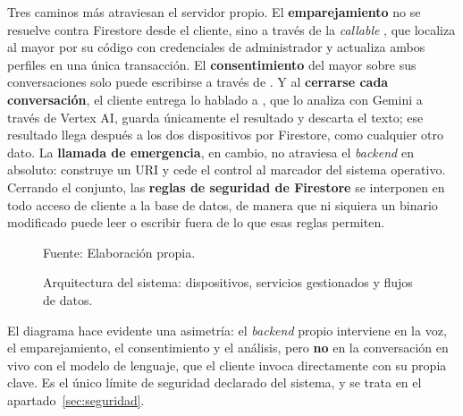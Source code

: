 Tres caminos más atraviesan el servidor propio. El \textbf{emparejamiento} no se resuelve contra Firestore
desde el cliente, sino a través de la \emph{callable} , que localiza al mayor por su
código con credenciales de administrador y actualiza ambos perfiles en una única transacción. El
\textbf{consentimiento} del mayor sobre sus conversaciones solo puede escribirse a través de
. Y al \textbf{cerrarse cada conversación}, el cliente entrega lo hablado a
, que lo analiza con Gemini a través de Vertex AI, guarda únicamente el resultado y
descarta el texto; ese resultado llega después a los dos dispositivos por Firestore, como cualquier otro
dato. La \textbf{llamada de emergencia}, en cambio, no atraviesa el \emph{backend} en absoluto: construye un
URI  y cede el control al marcador del sistema operativo. Cerrando el conjunto, las \textbf{reglas
de seguridad de Firestore} se interponen en todo acceso de cliente a la base de datos, de manera que ni
siquiera un binario modificado puede leer o escribir fuera de lo que esas reglas permiten.

\begin{figure}[htbp]\centering
  \caption{Arquitectura del sistema: dispositivos, servicios gestionados y flujos de datos.}
  \label{fig:arquitectura}

  \vspace{2pt}
  {\footnotesize Fuente: Elaboración propia.}
\end{figure}

El diagrama hace evidente una asimetría: el \emph{backend} propio interviene en la voz, el emparejamiento,
el consentimiento y el análisis, pero \textbf{no} en la conversación en vivo con el modelo de lenguaje, que
el cliente invoca directamente con su propia clave. Es el único límite de seguridad declarado del sistema, y
se trata en el apartado~\ref{sec:seguridad}.

